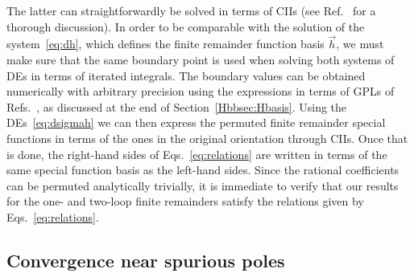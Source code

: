\documentclass[main.tex]{subfiles}
\begin{document}
The latter can straightforwardly be solved in terms of CIIs (see Ref.~\cite{Badger:2021nhg} for a thorough discussion). In order to be comparable with the solution of the system~\ref{eq:dh}, which defines the finite remainder function basis $\vec{h}$, we must make sure that the same boundary point is used when solving both systems of DEs in terms of iterated integrals. The boundary values can be obtained numerically with arbitrary precision using the expressions in terms of GPLs of Refs.~\cite{Papadopoulos:2015jft,Syrrakos:2020kba,Canko:2020ylt}, as discussed at the end of Section~\ref{Hbbsec:Hbasis}. Using the DEs~\ref{eq:dsigmah} we can then express the permuted finite remainder special functions in terms of the ones in the original orientation through CIIs. Once that is done, the right-hand sides of Eqs.~\ref{eq:relations} are written in terms of the same special function basis as the left-hand sides. Since the rational coefficients can be permuted analytically trivially, it is immediate to verify that our results for the one- and two-loop finite remainders satisfy the relations given by Eqs.~\ref{eq:relations}.




\subsection{Convergence near spurious poles}
\end{document}
